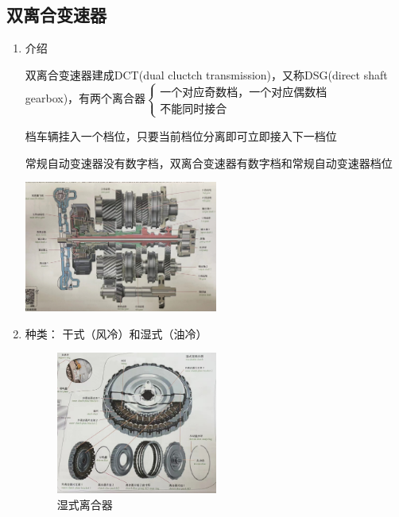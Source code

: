 	\subsection{双离合变速器}
		\begin{enumerate}
			\item 介绍
				
				双离合变速器建成DCT(dual cluctch transmission)，又称DSG(direct shaft gearbox)，有两个离合器$ \begin{cases}
					\text{一个对应奇数档，一个对应偶数档} \\
					\text{不能同时接合}
				\end{cases} $
			
				档车辆挂入一个档位，只要当前档位分离即可立即接入下一档位
				
				常规自动变速器没有数字档，双离合变速器有数字档和常规自动变速器档位
				\begin{center}
					\includegraphics[width=0.5\textwidth]{3-22}
				\end{center}
			\item 种类： 干式（风冷）和湿式（油冷）
				\begin{figure}[htbp]
					\centering
					\caption{\footnotesize 湿式离合器}
					\includegraphics[width=0.5\textwidth]{3-20}
				\end{figure}
		\end{enumerate}
	\clearpage
